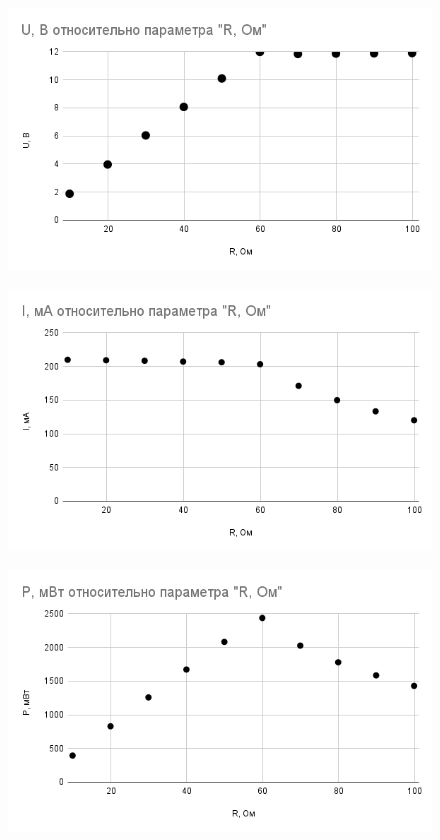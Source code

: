 \documentclass[a4paper,12pt]{article}
\begin{document}
\begin{figure}[h!]
	\begin{center}
		\includegraphics[scale=0.8]{ur1.png}
	\end{center}
\end{figure}
\newpage
\begin{figure}[h!]
	\begin{center}
		\includegraphics[scale=0.8]{ir.png}
	\end{center}
\end{figure}

\begin{figure}[ht!]
	\begin{center}
		\includegraphics[scale=0.8]{pr.png}
	\end{center}
\end{figure}
\end{document}
